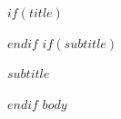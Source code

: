\documentclass[11pt,a4paper]{article}
\author{}
\begin{document}
$if(title)$\maketitle$endif$
$if(subtitle)$\begin{center}$subtitle$\end{center}$endif$
$body$
\end{document}
